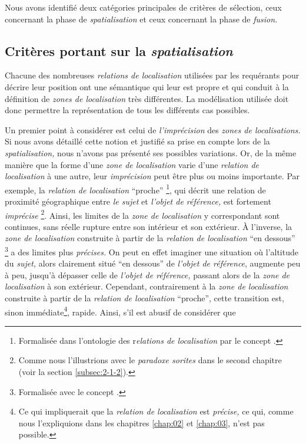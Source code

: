 Nous avons identifié deux catégories principales de critères de
sélection, ceux concernant la phase de \emph{spatialisation} et ceux
concernant la phase de \emph{fusion.}

\subsection{Critères portant sur la \emph{spatialisation}}

Chacune des nombreuses \emph{relations de localisation} utilisées par
les requérants pour décrire leur position ont une sémantique qui leur
est propre et qui conduit à la définition de \emph{zones de
  localisation} très différentes. La modélisation utilisée doit donc
permettre la représentation de tous les différents cas possibles.

Un premier point à considérer est celui de \emph{l'imprécision} des
\emph{zones de localisations.} Si nous avons détaillé cette notion et
justifié sa prise en compte lors de la \emph{spatialisation,} nous
n'avons pas présenté ses possibles variations. Or, de la même manière
que la forme d'une \emph{zone de localisation} varie d'une
\emph{relation de localisation} à une autre, leur \emph{imprécision}
peut être plus ou moins importante. Par exemple, la \emph{relation de
  localisation} \enquote{proche} \footnote{Formalisée dans l'ontologie
  des r\emph{elations de localisation} par le concept
  .}, qui décrit une relation de proximité
géographique entre \emph{le sujet} et \emph{l'objet de référence,} est
fortement \emph{imprécise} \footnote{Comme nous l'illustrions avec le
  \emph{paradoxe sorites} dans le second chapitre (voir la section
  \ref{subsec:2-1-2}).}. Ainsi, les limites de la \emph{zone de
  localisation} y correspondant sont continues, sans réelle rupture
entre son intérieur et son extérieur. À l'inverse, la \emph{zone de
  localisation} construite à partir de la \emph{relation de
  localisation} \enquote{en dessous} \footnote{Formalisée avec le
  concept .} a des limites plus
\emph{précises.} On peut en effet imaginer une situation où l'altitude
du \emph{sujet,} alors clairement situé \enquote{en dessous} de
\emph{l'objet de référence}, augmente peu à peu, jusqu'à dépasser
celle de \emph{l'objet de référence,} passant alors de la \emph{zone
  de localisation} à son extérieur. Cependant, contrairement à la
\emph{zone de localisation} construite à partir de la \emph{relation
  de localisation} \enquote{proche}, cette transition est, sinon
immédiate\footnote{Ce qui impliquerait que la \emph{relation de
    localisation} est \emph{précise,} ce qui, comme nous l'expliquions
  dans les chapitres \ref{chap:02} et \ref{chap:03}, n'est pas
  possible.}, rapide. Ainsi, s'il est abusif de considérer que
